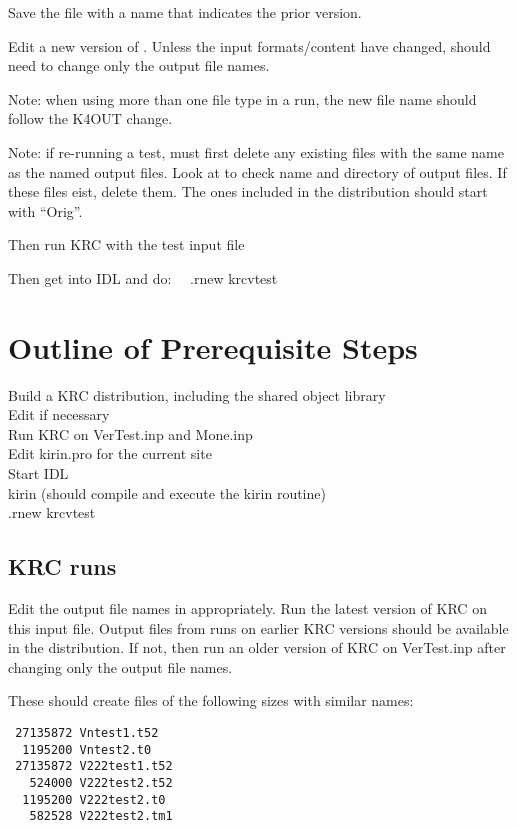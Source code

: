 \documentclass{article}  %
\begin{document}
Save the   file with a name that indicates the prior version.

Edit a new version of .  Unless the input formats/content have changed, should need to change only the output file names.

Note: when using more than one file type in a run, the new file name should follow the K4OUT change.

Note: if re-running a test, must first delete any existing files with the same name as the  named output files. Look at  to check name and directory of output files. If these files eist, delete them. The ones included in the distribution should start with ``Orig''. 

Then run KRC with the test input file

Then get into IDL and do: \ \  .rnew krcvtest


\section{Outline of Prerequisite Steps} %
Build a KRC distribution, including the shared object library
\\ Edit  if necessary
\\ Run KRC on VerTest.inp and Mone.inp
\\ Edit kirin.pro for the current site
\\ Start IDL
\\ kirin  (should compile and execute the kirin routine)
\\ .rnew krcvtest


\subsection{KRC runs}
Edit the output file names in    appropriately. Run the latest version of KRC on this input file.
\qi Output files from runs on earlier KRC versions should be available in the distribution.  If not, then run an older version of KRC  on VerTest.inp after changing only the output file names.

These should create files of the following sizes with similar names:
\vspace{-3.mm} 
\begin{verbatim}
 27135872 Vntest1.t52
  1195200 Vntest2.t0
 27135872 V222test1.t52
   524000 V222test2.t52
  1195200 V222test2.t0
   582528 V222test2.tm1
\end{verbatim}
\end{document}
